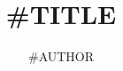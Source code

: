 \documentclass{beamer}
\title[]{#{TITLE}}
\author{#{AUTHOR}}
\institute[#{SHORTINS}]{#{LINS}}
\begin{document}
\maketitle

\begin{haru-frame}

\end{haru-frame}

\haruthanks
\end{document}
